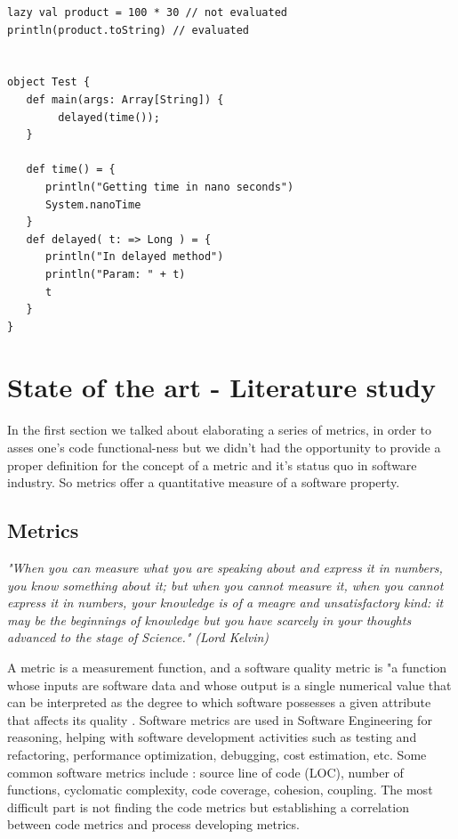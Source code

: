 \documentclass{article}
\begin{document}
\begin{lstlisting}
lazy val product = 100 * 30 // not evaluated
println(product.toString) // evaluated 


object Test {
   def main(args: Array[String]) {
        delayed(time());
   }

   def time() = {
      println("Getting time in nano seconds")
      System.nanoTime
   }
   def delayed( t: => Long ) = {
      println("In delayed method")
      println("Param: " + t)
      t
   }
}

\end{lstlisting}

\section {State of the art - Literature study}
In the first section we talked about elaborating a series of metrics, in order to asses one's code functional-ness but we didn't had the opportunity to provide a proper definition for the concept of a metric and it's status quo in software industry. So metrics offer a quantitative measure of a software property. 

\subsection{Metrics}

\textit{"When you can measure what you are speaking about and express it in numbers, you know something about it; but when you cannot measure it, when you cannot express it in numbers, your knowledge is of a meagre and unsatisfactory kind: it may be the beginnings of knowledge but you have scarcely in your thoughts advanced to the stage of Science." (Lord Kelvin)}\par \par

A metric is a measurement function, and a software quality metric is "a function whose inputs are software data and whose output is a single numerical value that can be interpreted as the degree to which software possesses a given attribute that affects its quality \cite{Kaner04softwareengineering}. Software metrics are used in Software Engineering for reasoning, helping with software development activities such as testing and refactoring, performance optimization, debugging, cost estimation, etc. Some common software metrics include : source line of code (LOC), number of functions, cyclomatic complexity, code coverage, cohesion, coupling. The most difficult part is not finding the code metrics but establishing a correlation between code metrics and process developing metrics. \par
\end{document}
